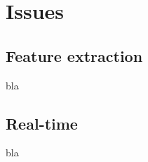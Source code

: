 \chapter{Issues}
\label{chap:eval_issues}

\section{Feature extraction}

\noindent bla
\newline

\section{Real-time}

\noindent bla
\newline
